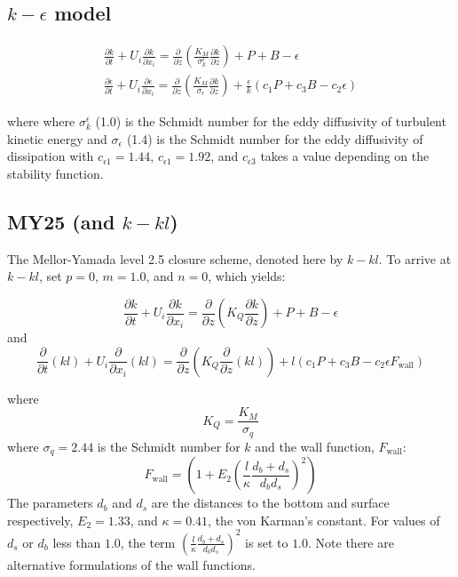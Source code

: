 \subsection{$k-\epsilon$ model} 
\begin{gather}
\frac{\partial k}{\partial t}+U_i\frac{\partial k}{\partial x_i} = \frac{\partial}{\partial z}\left(\frac{K_M}{\sigma^\epsilon_k}\frac{\partial k}{\partial z}\right) + P + B -\epsilon\\
\frac{\partial\epsilon}{\partial t}+U_i\frac{\partial\epsilon}{\partial x_i}
= \frac{\partial}{\partial z}\left(\frac{K_M}{\sigma_\epsilon}\frac{\partial k}{\partial z}\right) + \frac{\epsilon}{k}(c_1P + c_3B -c_2\epsilon)
\end{gather}

where where $\sigma^\epsilon_k$ (1.0) is the Schmidt number for the eddy diffusivity of turbulent kinetic energy 
and $\sigma_\epsilon$ (1.4) is the Schmidt number for the eddy diffusivity of dissipation with $c_{\epsilon1}=1.44$, 
$c_{\epsilon1}=1.92$, and $c_{\epsilon3}$ takes a value depending on the stability function.

\subsection{MY25 (and $k-kl$)}

The Mellor-Yamada level 2.5 closure scheme, denoted here by $k-kl$. To arrive at $k-kl$, set $p=0$, $m=1.0$, and $n=0$, which yields:

\begin{equation}
\frac{\partial k}{\partial t} + U_i\frac{\partial k}{\partial x_i} = \frac{\partial}{\partial z}\left(K_Q\frac{\partial k}{\partial z}\right) + P + B - \epsilon
\end{equation}
and
\begin{equation}
\frac{\partial}{\partial t}(kl) + U_i\frac{\partial}{\partial x_i}(kl) = \frac{\partial}{\partial z}\left(K_Q\frac{\partial}{\partial z}(kl)\right) + l(c_1P + c_3B - c_2\epsilon F_{\mathrm{wall}})
\end{equation}

where 
\begin{equation}
K_Q=\frac{K_M}{\sigma_q}
\end{equation}
where $\sigma_q=2.44$ is the Schmidt number for $k$ and the wall function, $F_{\mathrm{wall}}$:
\begin{equation}
F_{\mathrm{wall}}=\left(1+E_2\left(\frac{l}{\kappa}\frac{d_b + d_s}{d_bd_s}\right)^2\right)
\label{fwall}
\end{equation} 
The parameters $d_b$ and $d_s$ are the distances to the bottom and surface respectively, $E_2=1.33$, and $\kappa=0.41$, the von Karman's constant. For values of $d_s$ or $d_b$ less than $1.0$, the term $\left(\frac{l}{\kappa}\frac{d_b + d_s}{d_bd_s}\right)^2$ is set to $1.0$. Note there are alternative formulations of the wall functions.

